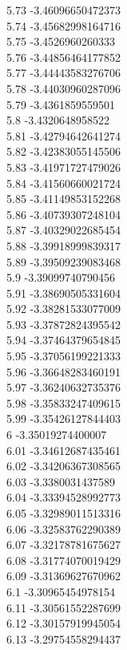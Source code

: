 {5.73	-3.46096650472373\\
5.74	-3.45682998164716\\
5.75	-3.4526960260333\\
5.76	-3.44856464177852\\
5.77	-3.44443583276706\\
5.78	-3.44030960287096\\
5.79	-3.4361859559501\\
5.8	-3.4320648958522\\
5.81	-3.42794642641274\\
5.82	-3.42383055145506\\
5.83	-3.41971727479026\\
5.84	-3.41560660021724\\
5.85	-3.41149853152268\\
5.86	-3.40739307248104\\
5.87	-3.40329022685454\\
5.88	-3.39918999839317\\
5.89	-3.39509239083468\\
5.9	-3.39099740790456\\
5.91	-3.38690505331604\\
5.92	-3.38281533077009\\
5.93	-3.37872824395542\\
5.94	-3.37464379654845\\
5.95	-3.37056199221333\\
5.96	-3.36648283460191\\
5.97	-3.36240632735376\\
5.98	-3.35833247409615\\
5.99	-3.35426127844403\\
6	-3.35019274400007\\
6.01	-3.34612687435461\\
6.02	-3.34206367308565\\
6.03	-3.3380031437589\\
6.04	-3.33394528992773\\
6.05	-3.32989011513316\\
6.06	-3.32583762290389\\
6.07	-3.32178781675627\\
6.08	-3.31774070019429\\
6.09	-3.31369627670962\\
6.1	-3.30965454978154\\
6.11	-3.30561552287699\\
6.12	-3.30157919945054\\
6.13	-3.29754558294437\\
}
